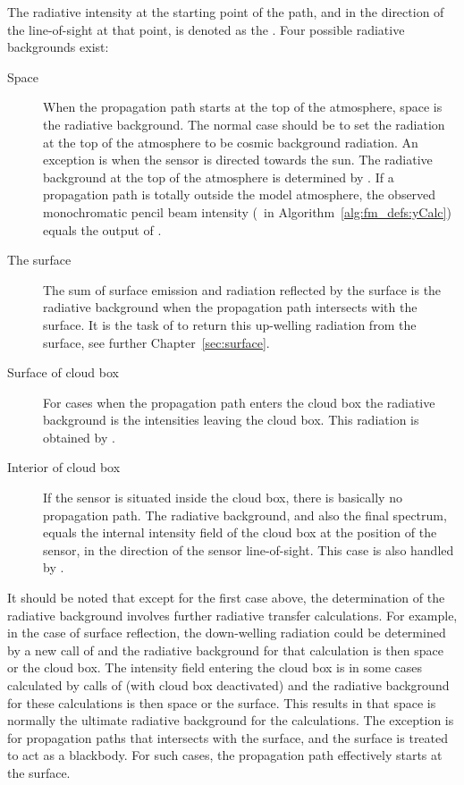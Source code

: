 The radiative intensity at the starting point of the path, and in the
direction of the line-of-sight at that point, is denoted as the
. Four possible radiative backgrounds
exist:
\begin{description}
\item[Space] When the propagation path starts at the top of the
  atmosphere, space is the radiative background. The normal case
  should be to set the radiation at the top of the atmosphere to be
  cosmic background radiation. An exception is when the sensor is
  directed towards the sun. The radiative background at the top of the
  atmosphere is determined by . If a
  propagation path is totally outside the model atmosphere, the
  observed monochromatic pencil beam intensity (\ in
  Algorithm~\ref{alg:fm_defs:yCalc}) equals the output of
  .
\item[The surface] The sum of surface emission and radiation reflected by the
  surface is the radiative background when the propagation path intersects with
  the surface. It is the task of  to return this
  up-welling radiation from the surface, see further
  Chapter~\ref{sec:surface}.
\item[Surface of cloud box] For cases when the propagation path enters
  the cloud box the radiative background is the intensities leaving
  the cloud box. This radiation is obtained by
  . 
\item[Interior of cloud box] If the sensor is situated inside the
  cloud box, there is basically no propagation path. The radiative
  background, and also the final spectrum, equals the internal
  intensity field of the cloud box at the position of the sensor, in
  the direction of the sensor line-of-sight. This case is also handled
  by .
\end{description}
It should be noted that except for the first case above, the determination of
the radiative background involves further radiative transfer calculations. For
example, in the case of surface reflection, the down-welling radiation could be
determined by a new call of  and the radiative
background for that calculation is then space or the cloud box. The intensity
field entering the cloud box is in some cases calculated by calls of
 (with cloud box deactivated) and the radiative
background for these calculations is then space or the surface. This results
in that space is normally the ultimate radiative background for the
calculations. The exception is for propagation paths that intersects with the
surface, and the surface is treated to act as a blackbody. For such cases, the
propagation path effectively starts at the surface.




